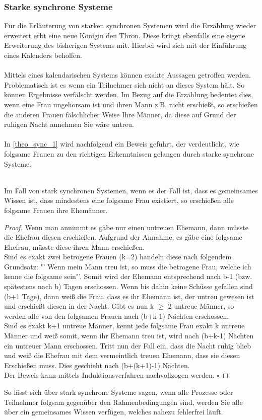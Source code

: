 \subsubsection{Starke synchrone Systeme}
\label{stark_sync_wissen}
Für die Erläuterung von starken synchronen Systemen wird die Erzählung wieder erweitert erbt eine neue Königin den Thron. Diese bringt ebenfalls eine eigene Erweiterung des bisherigen Systems mit. Hierbei wird sich mit der Einführung eines Kalenders beholfen.\\\\ 
Mittels eines kalendarischen Systems können exakte Aussagen getroffen werden. Problematisch ist es wenn ein Teilnehmer sich nicht an dieses System hält. So können Ergebnisse verfälscht werden. Im Bezug auf die Erzählung bedeutet dies, wenn eine Frau ungehorsam ist und ihren Mann z.B. nicht erschießt, so erschießen die anderen Frauen fälschlicher Weise Ihre Männer, da diese auf Grund der ruhigen Nacht annehmen Sie wäre untreu.\\\\
In \ref{theo_sync_1} wird nachfolgend ein Beweis geführt, der verdeutlicht, wie folgsame Frauen zu den richtigen Erkenntnissen gelangen durch starke synchrone Systeme. 
\begin{theorem}\\
\label{theo_sync_1}
Im Fall von stark synchronen Systemen, wenn es der Fall ist, dass es gemeinsames Wissen ist, dass mindestens eine folgsame Frau existiert, so erschießen alle folgsame Frauen ihre Ehemänner.
\end{theorem}
\begin{proof}
Wenn man annimmt es gäbe nur einen untreuen Ehemann, dann müsste die Ehefrau diesen erschießen. Aufgrund der Annahme, es gäbe eine folgsame Ehefrau, müsste diese ihren Mann erschießen.\\
Sind es exakt zwei betrogene Frauen (k=2) handeln diese nach folgendem Grundsatz: "' Wenn mein Mann treu ist, so muss die betrogene Frau, welche ich kenne die folgsame sein"'. Somit wird der Ehemann entsprechend nach b-1 (bzw. spätestens nach b) Tagen erschossen. Wenn bis dahin keine Schüsse gefallen sind (b+1 Tage), dann weiß die Frau, dass es ihr Ehemann ist, der untreu gewesen ist und erschießt diesen in der Nacht. Gibt es nun k $\geq$ 2 untreue Männer, so werden alle von den folgsamen Frauen nach (b+k-1) Nächten erschossen.\\
Sind es exakt k+1 untreue Männer, kennt jede folgsame Frau exakt k untreue Männer und weiß somit, wenn ihr Ehemann treu ist, wird  nach (b+k-1) Nächten ein untreuer Mann erschossen. Tritt nun der Fall ein, dass die Nacht ruhig blieb und weiß die Ehefrau mit dem vermeintlich treuen Ehemann, dass sie diesen Erschießen muss. Dies geschieht nach (b+(k+1)-1) Nächten. \\ Der Beweis kann mittels Induktionsverfahren nachvollzogen werden.
$\square$
\end{proof}
So lässt sich über stark synchrone Systeme sagen, wenn alle Prozesse oder Teilnehmer folgsam gegenüber den Rahmenbedingungen sind, werden Sie alle über ein gemeinsames Wissen verfügen, welches nahezu fehlerfrei läuft.